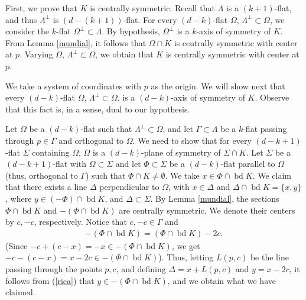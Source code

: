 \documentclass[12pt,thmsa]{amsart}
\newcommand{\bd}{\operatorname*{bd}}
\begin{document}
First, we prove that $K$ is centrally symmetric. 
Recall that $\Lambda$ is a $(k+1)$-flat, and thus $\Lambda^{\perp}$ is $(d-(k+1))$-flat.
For every $(d-k)$-flat $\Omega$, $\Lambda^{\perp} \subset \Omega$, we consider the $k$-flat 
$\Omega^{\perp}\subset \Lambda$. By hypothesis, $\Omega^{\perp}$ is a $k$-axis of symmetry of $K$. From Lemma \ref{mundial}, it follows that $\Omega \cap K$ is centrally symmetric with center at $p$. Varying $\Omega$, $ \Lambda^{\perp} \subset \Omega$, we obtain that $K$ is centrally symmetric with center at $p$.    

We take a system of coordinates with $p$ as the origin. We will show next that every $(d-k)$-flat $\Omega$, $\Lambda^{\perp} \subset \Omega$, is a $(d-k)$-axis of symmetry of $K$. Observe that this fact is, in a sense, dual to our hypothesis. 

 
Let $\Omega$ be a $(d-k)$-flat such that $\Lambda^{\perp} \subset \Omega$, and let $\Gamma\subset \Lambda$ be a $k$-flat passing through $p\in \Gamma  $ and orthogonal to $\Omega$. %
We need to show that for every $(d-k+1)$-flat $\Sigma$ containing $\Omega$, $\Omega$ is a $(d-k)$-plane of symmetry of $\Sigma \cap K$. Let $\Sigma$ be a $(d-k+1)$-flat with   $\Omega \subset \Sigma$ and let
$\Phi\subset \Sigma$ be a $(d-k)$-flat parallel to $\Omega$ (thus, orthogonal to $\Gamma$) such that $ \Phi \cap K\not= \emptyset$. We take $x\in \Phi \cap \bd K$. We claim that there exists a line $\Delta$ perpendicular to  $\Omega$, with $x\in \Delta$ and $\Delta \cap \bd K=\{x,y\}$, where $y\in (-\Phi) \cap \bd K$, and $\Delta \subset \Sigma$. By Lemma \ref{mundial}, the sections $\Phi \cap \bd K$ and $-(\Phi \cap \bd K)$ are centrally symmetric. We denote their centers by $c, -c$, respectively. Notice that $c,-c\in \Gamma$ and
\begin{eqnarray}\label{rica}
-(\Phi \cap \bd K)=(\Phi \cap \bd K)-2c.    
\end{eqnarray}
(Since $-c+(c-x)=-x\in -(\Phi \cap \bd K)$, we get $-c-(c-x)=x-2c \in -(\Phi \cap \bd K)$). Thus, letting $L(p,c)$ be the line passing through the points $p,c$, and  defining $\Delta=x+L(p,c)$ and $y=x-2c$, it follows from (\ref{rica}) that $y\in -(\Phi \cap \bd K)$, and we obtain what we have claimed. 
\end{document}
